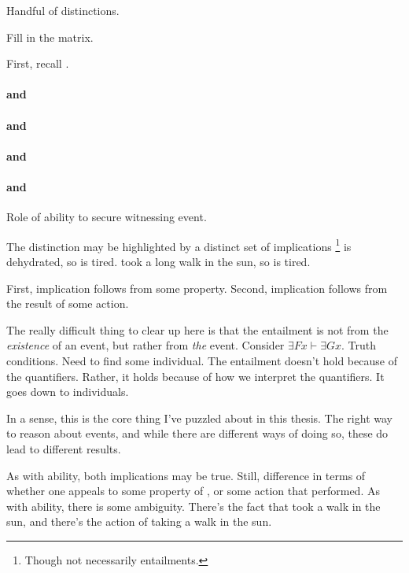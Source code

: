 \begin{note}
  Handful of distinctions.

  Fill in the matrix.

  First, recall \gsi{}.
\end{note}


\paragraph{\AR{} and \nr{}}



\paragraph{\AR{} and \ur{}}



\paragraph{\WR{} and \nr{}}



\paragraph{\WR{} and \ur{}}


\begin{note}
  Role of ability to secure witnessing event.

  The distinction may be highlighted by a distinct set of implications\nolinebreak
  \footnote{
    Though not necessarily entailments.
  }
   is dehydrated, so  is tired.
   took a long walk in the sun, so  is tired.

  First, implication follows from some property.
  Second, implication follows from the result of some action.
  {
    \color{red}
    The really difficult thing to clear up here is that the entailment is not from the \emph{existence} of an event, but rather from \emph{the} event.
    Consider \(\exists Fx \vdash \exists Gx\).
    Truth conditions.
    Need to find some individual.
    The entailment doesn't hold because of the quantifiers.
    Rather, it holds because of how we interpret the quantifiers.
    It goes down to individuals.

    In a sense, this is the core thing I've puzzled about in this thesis.
    The right way to reason about events, and while there are different ways of doing so, these do lead to different results.
  }
  As with ability, both implications may be true.
  Still, difference in terms of whether one appeals to some property of , or some action that  performed.
  As with ability, there is some ambiguity.
  There's the fact that  took a walk in the sun, and there's the action of  taking a walk in the sun.
\end{note}


